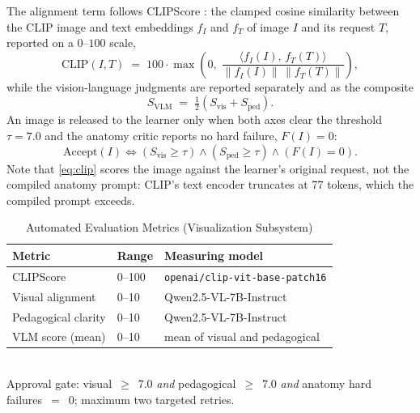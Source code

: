 \documentclass[conference]{IEEEtran}
\begin{document}
The alignment term follows CLIPScore \cite{clipscore}: the clamped cosine similarity between the CLIP image and text embeddings $f_I$ and $f_T$ of image $I$ and its request $T$, reported on a $0$--$100$ scale,
\begin{equation}
\label{eq:clip}
\mathrm{CLIP}(I, T) \;=\; 100 \cdot \max\!\left(0, \; \frac{\langle f_I(I),\, f_T(T)\rangle}{\lVert f_I(I)\rVert \, \lVert f_T(T)\rVert}\right),
\end{equation}
while the vision-language judgments are reported separately and as the composite
\begin{equation}
\label{eq:vlm}
S_{\mathrm{VLM}} \;=\; \tfrac{1}{2}\left(S_{\mathrm{vis}} + S_{\mathrm{ped}}\right).
\end{equation}
An image is released to the learner only when both axes clear the threshold $\tau = 7.0$ and the anatomy critic reports no hard failure, $F(I) = 0$:
\begin{equation}
\label{eq:accept}
\mathrm{Accept}(I) \iff \left(S_{\mathrm{vis}} \geq \tau\right) \wedge \left(S_{\mathrm{ped}} \geq \tau\right) \wedge \left(F(I) = 0\right).
\end{equation}
Note that \eqref{eq:clip} scores the image against the learner's original request, not the compiled anatomy prompt: CLIP's text encoder truncates at 77 tokens, which the compiled prompt exceeds.

\begin{table}[t]
\caption{Automated Evaluation Metrics (Visualization Subsystem)}
\label{tab:evalmetrics}
\centering
\begin{tabular}{p{2.2cm} p{1.3cm} p{3.7cm}}
\toprule
\textbf{Metric} & \textbf{Range} & \textbf{Measuring model} \\
\midrule
CLIPScore & 0--100 & \texttt{openai/clip-vit-base-patch16} \\
Visual alignment & 0--10 & Qwen2.5-VL-7B-Instruct \\
Pedagogical clarity & 0--10 & Qwen2.5-VL-7B-Instruct \\
VLM score (mean) & 0--10 & mean of visual and pedagogical \\
\bottomrule
\end{tabular}
\\[2pt]
\footnotesize Approval gate: visual~$\geq$~7.0 \emph{and} pedagogical~$\geq$~7.0 \emph{and} anatomy hard failures~$=$~0; maximum two targeted retries.
\end{table}
\end{document}
